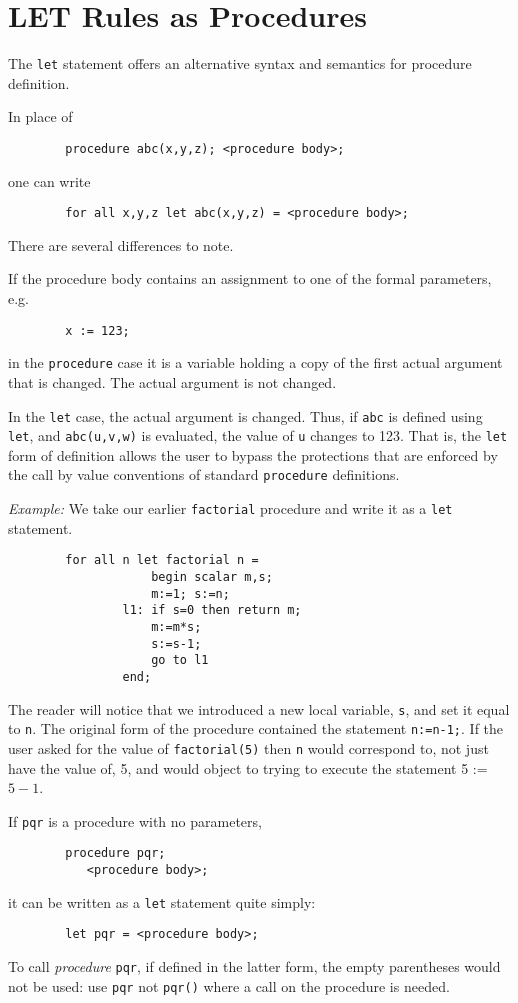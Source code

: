 \section{LET Rules as Procedures}

The \texttt{let} statement offers an alternative syntax and
semantics for procedure definition.

In place of
\begin{verbatim}
        procedure abc(x,y,z); <procedure body>;
\end{verbatim}
one can write
\begin{verbatim}
        for all x,y,z let abc(x,y,z) = <procedure body>;
\end{verbatim}
There are several differences to note.

If the procedure body contains an assignment to one of the formal
parameters, e.g.
\begin{verbatim}
        x := 123;
\end{verbatim}
in the \texttt{procedure} case it is a variable holding a copy of the first
actual argument that is changed.  The actual argument is not changed.

In the \texttt{let} case, the actual argument is changed.  Thus, if \texttt{abc}
is defined using \texttt{let}, and \texttt{abc(u,v,w)} is evaluated, the value
of \texttt{u} changes to 123.  That is, the \texttt{let} form of definition
allows the user to bypass the protections that are enforced by the call
by value conventions of standard \texttt{procedure} definitions.

\textit{Example:}  We take our earlier \texttt{factorial}
procedure and write it as a \texttt{let} statement.
\begin{verbatim}
        for all n let factorial n =
                    begin scalar m,s;
                    m:=1; s:=n;
                l1: if s=0 then return m;
                    m:=m*s;
                    s:=s-1;
                    go to l1
                end;
\end{verbatim}
The reader will notice that we introduced a new local variable, \texttt{s},
and set it equal to \texttt{n}.  The original form of the procedure contained
the statement \texttt{n:=n-1;}.  If the user asked for the value of
\texttt{factorial(5)} then \texttt{n} would correspond to, not just have the value
of, 5, and {\REDUCE} would object to trying to execute the statement
5 := $5-1$.

If \texttt{pqr} is a procedure with no parameters,
\begin{verbatim}
        procedure pqr;
           <procedure body>;
\end{verbatim}
it can be written as a \texttt{let} statement quite simply:
\begin{verbatim}
        let pqr = <procedure body>;
\end{verbatim}
To call \emph{procedure} \texttt{pqr}, if defined in the latter form, the empty
parentheses would not be used: use \texttt{pqr} not \texttt{pqr()} where a call
on the procedure is needed.

